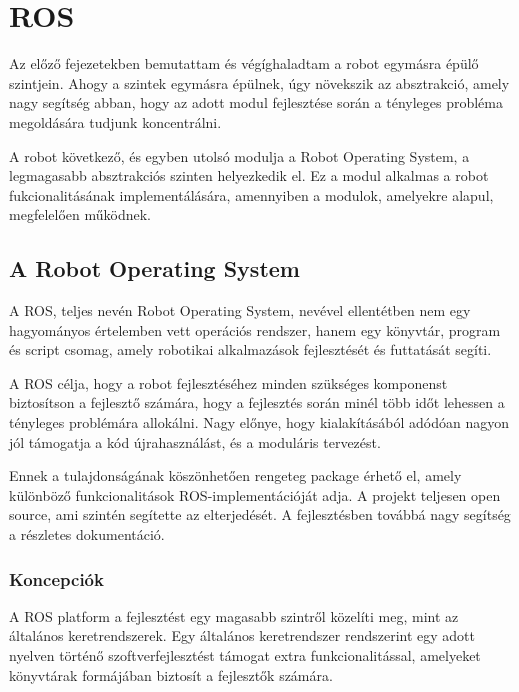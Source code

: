 \chapter{ROS}

Az előző fejezetekben bemutattam és végíghaladtam a robot egymásra épülő
szintjein. Ahogy a szintek egymásra épülnek, úgy növekszik az absztrakció, amely
nagy segítség abban, hogy az adott modul fejlesztése során a tényleges probléma
megoldására tudjunk koncentrálni.

A robot következő, és egyben utolsó modulja a Robot Operating System, a
legmagasabb absztrakciós szinten helyezkedik el. Ez a modul alkalmas a robot
fukcionalitásának implementálására, amennyiben a modulok, amelyekre alapul,
megfelelően működnek.

\section{A Robot Operating System}

A ROS, teljes nevén Robot Operating System, nevével ellentétben nem egy
hagyományos értelemben vett operációs rendszer, hanem egy könyvtár, program és
script csomag, amely robotikai alkalmazások fejlesztését és futtatását segíti.

A ROS célja, hogy a robot fejlesztéséhez minden szükséges komponenst biztosítson
a fejlesztő számára, hogy a fejlesztés során minél több időt lehessen a tényleges
problémára allokálni. Nagy előnye, hogy kialakításából adódóan nagyon jól
támogatja a kód újrahasználást, és a moduláris tervezést.

Ennek a tulajdonságának köszönhetően rengeteg package érhető el, amely különböző
funkcionalitások ROS-implementációját adja. A projekt teljesen open source, ami
szintén segítette az elterjedését. A fejlesztésben továbbá nagy segítség a
részletes dokumentáció.


\subsection{Koncepciók}

A ROS platform a fejlesztést egy magasabb szintről közelíti meg, mint az
általános keretrendszerek. Egy általános keretrendszer rendszerint egy adott
nyelven történő szoftverfejlesztést támogat extra funkcionalitással, amelyeket
könyvtárak formájában biztosít a fejlesztők számára.


